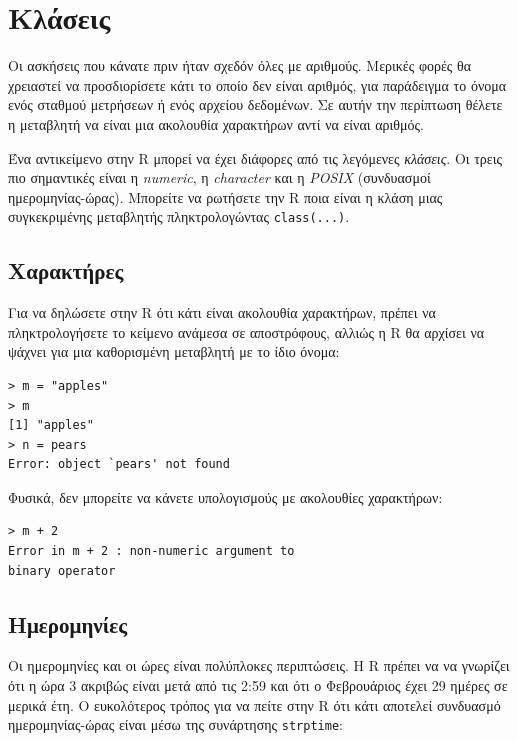 \documentclass[a4paper,10pt,twocolumn]{article}
\begin{document}
\section{Κλάσεις}

Οι ασκήσεις που κάνατε πριν ήταν σχεδόν όλες με αριθμούς. Μερικές φορές θα χρειαστεί να προσδιορίσετε κάτι το 
οποίο δεν είναι αριθμός, για παράδειγμα το όνομα ενός σταθμού μετρήσεων ή ενός αρχείου δεδομένων. Σε αυτήν την
περίπτωση θέλετε η μεταβλητή να είναι μια ακολουθία χαρακτήρων αντί να είναι αριθμός. 

Ένα αντικείμενο στην R μπορεί να έχει διάφορες από τις λεγόμενες \emph{κλάσεις}. Οι τρεις πιο σημαντικές είναι
η \emph{numeric}, η \emph{character} και η \emph{POSIX} (συνδυασμοί ημερομηνίας-ώρας). Μπορείτε να ρωτήσετε
την R ποια είναι η κλάση μιας συγκεκριμένης μεταβλητής πληκτρολογώντας \texttt{class(...)}. 

\subsection{Χαρακτήρες}
\label{sec:characters}

Για να δηλώσετε στην R ότι κάτι είναι ακολουθία χαρακτήρων, πρέπει να πληκτρολογήσετε το κείμενο ανάμεσα σε
αποστρόφους, αλλιώς η R θα αρχίσει να ψάχνει για μια καθορισμένη μεταβλητή με το ίδιο όνομα:

\begin{Verbatim}[frame=single,gobble=0]
> m = "apples"
> m
[1] "apples"
> n = pears
Error: object `pears' not found
\end{Verbatim}

Φυσικά, δεν μπορείτε να κάνετε υπολογισμούς με ακολουθίες χαρακτήρων:

\begin{Verbatim}[frame=single,gobble=0]
> m + 2
Error in m + 2 : non-numeric argument to 
binary operator
\end{Verbatim}

\subsection{Ημερομηνίες}

Οι ημερομηνίες και οι ώρες είναι πολύπλοκες περιπτώσεις. Η R πρέπει να να γνωρίζει ότι η ώρα 3 ακριβώς είναι
μετά από τις 2:59 και ότι ο Φεβρουάριος έχει 29 ημέρες σε μερικά έτη. Ο ευκολότερος τρόπος για να πείτε
στην R ότι κάτι αποτελεί συνδυασμό ημερομηνίας-ώρας είναι μέσω της συνάρτησης \texttt{strptime}:
\end{document}
